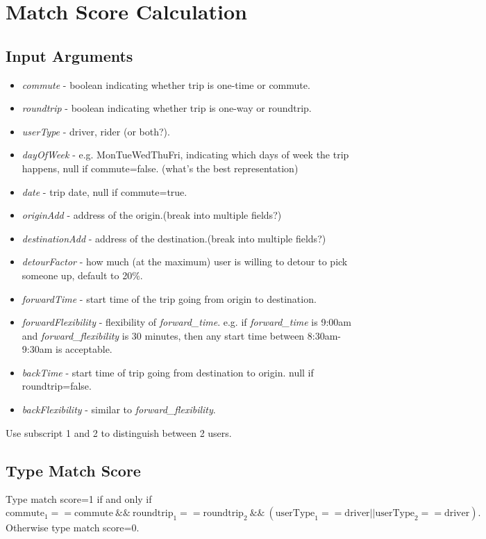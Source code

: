\documentclass{article}
\begin{document}
\section{Match Score Calculation}
\subsection{Input Arguments}
\begin{itemize}
\item \textit{commute} - boolean indicating whether trip is one-time or commute.
\item \textit{roundtrip} - boolean indicating whether trip is one-way or roundtrip.
\item \textit{userType} - driver, rider (or both?).
\item \textit{dayOfWeek} - e.g. MonTueWedThuFri, indicating which days of week the trip happens, null if commute=false. (what's the best representation)
\item \textit{date} - trip date, null if commute=true.
\item \textit{originAdd} - address of the origin.(break into multiple fields?)
\item \textit{destinationAdd} - address of the destination.(break into multiple fields?)
\item \textit{detourFactor} - how much (at the maximum) user is willing to detour to pick someone up, default to 20\%.
\item \textit{forwardTime} - start time of the trip going from origin to destination.
\item \textit{forwardFlexibility} - flexibility of \textit{forward\_time}.  e.g. if \textit{forward\_time} is 9:00am and \textit{forward\_flexibility} is 30 minutes, then any start time between 8:30am-9:30am is acceptable.
\item \textit{backTime} - start time of trip going from destination to origin.  null if roundtrip=false.
\item \textit{backFlexibility} - similar to \textit{forward\_flexibility}.
\end{itemize}
Use subscript 1 and 2 to distinguish between 2 users.

\subsection{Type Match Score}
Type match score=1 if and only if
\begin{equation*}
\mbox{commute}_1 == \mbox{commute} \ \&\& \ \mbox{roundtrip}_1==\mbox {roundtrip}_2 \ \&\&\ (\mbox{userType}_1 == \mbox{driver} || \mbox{userType}_2 == \mbox{driver}).
\end{equation*}
Otherwise type match score=0.
\end{document}
